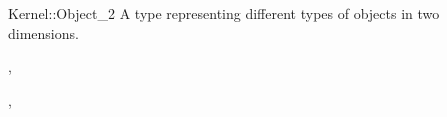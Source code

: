 \begin{ccRefConcept}{Kernel::Object_2}
A type representing different types of objects in two dimensions.

\ccRefines
{},

\ccSeeAlso
{}, 

\end{ccRefConcept}
